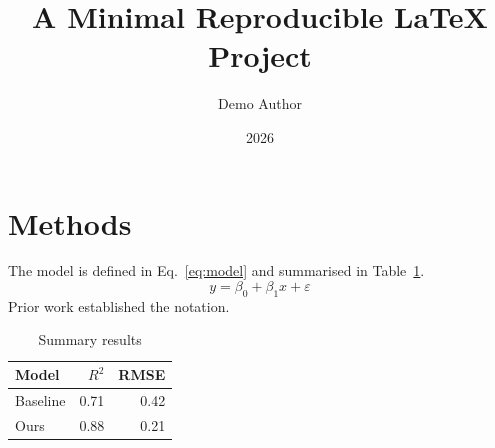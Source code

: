 \documentclass[11pt]{article}
\title{A Minimal Reproducible LaTeX Project}
\author{Demo Author}
\date{2026}
\begin{document}
\maketitle



\section{Methods}\label{sec:methods}
The model is defined in Eq.~\eqref{eq:model} and summarised in Table~\ref{tab:results}.
\begin{equation}
  y = \beta_0 + \beta_1 x + \varepsilon \label{eq:model}
\end{equation}
Prior work \cite{knuth1984} established the notation.

\begin{table}[htbp]
\centering
\caption{Summary results}\label{tab:results}
\begin{tabular}{lrr}
\toprule
Model & $R^2$ & RMSE \\
\midrule
Baseline & 0.71 & 0.42 \\
Ours     & 0.88 & 0.21 \\
\bottomrule
\end{tabular}
\end{table}



\end{document}
